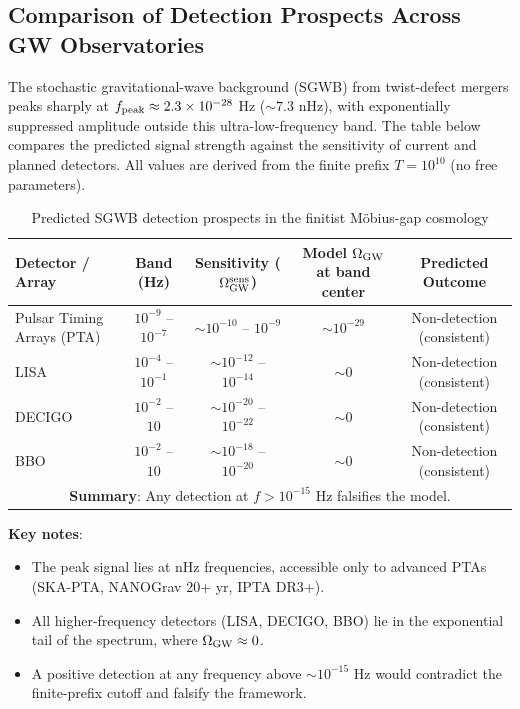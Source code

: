 \subsection{Comparison of Detection Prospects Across GW Observatories}

The stochastic gravitational-wave background (SGWB) from twist-defect mergers peaks sharply at $f_{\rm peak} \approx 2.3 \times 10^{-28}$ Hz ($\sim 7.3$ nHz), with exponentially suppressed amplitude outside this ultra-low-frequency band. The table below compares the predicted signal strength against the sensitivity of current and planned detectors. All values are derived from the finite prefix $T=10^{10}$ (no free parameters).

\begin{table}[h]
\centering
\caption{Predicted SGWB detection prospects in the finitist Möbius-gap cosmology}
\begin{tabular}{lcccc}
\toprule
\textbf{Detector / Array} & \textbf{Band (Hz)} & \textbf{Sensitivity} ($\Omega_{\rm GW}^{\rm sens}$) & \textbf{Model $\Omega_{\rm GW}$ at band center} & \textbf{Predicted Outcome} \\
\midrule
Pulsar Timing Arrays (PTA) & $10^{-9}$ -- $10^{-7}$ & $\sim 10^{-10}$ -- $10^{-9}$ & $\sim 10^{-29}$ & Non-detection (consistent) \\
LISA & $10^{-4}$ -- $10^{-1}$ & $\sim 10^{-12}$ -- $10^{-14}$ & $\sim 0$ & Non-detection (consistent) \\
DECIGO & $10^{-2}$ -- $10$ & $\sim 10^{-20}$ -- $10^{-22}$ & $\sim 0$ & Non-detection (consistent) \\
BBO & $10^{-2}$ -- $10$ & $\sim 10^{-18}$ -- $10^{-20}$ & $\sim 0$ & Non-detection (consistent) \\
\midrule
\multicolumn{5}{c}{\textbf{Summary}: Any detection at $f > 10^{-15}$ Hz falsifies the model.} \\
\bottomrule
\end{tabular}
\label{tab:gw-comparison}
\end{table}

\textbf{Key notes}:
\begin{itemize}
    \item The peak signal lies at nHz frequencies, accessible only to advanced PTAs (SKA-PTA, NANOGrav 20+ yr, IPTA DR3+).
    \item All higher-frequency detectors (LISA, DECIGO, BBO) lie in the exponential tail of the spectrum, where $\Omega_{\rm GW} \approx 0$.
    \item A positive detection at any frequency above $\sim 10^{-15}$ Hz would contradict the finite-prefix cutoff and falsify the framework.
\end{itemize}
